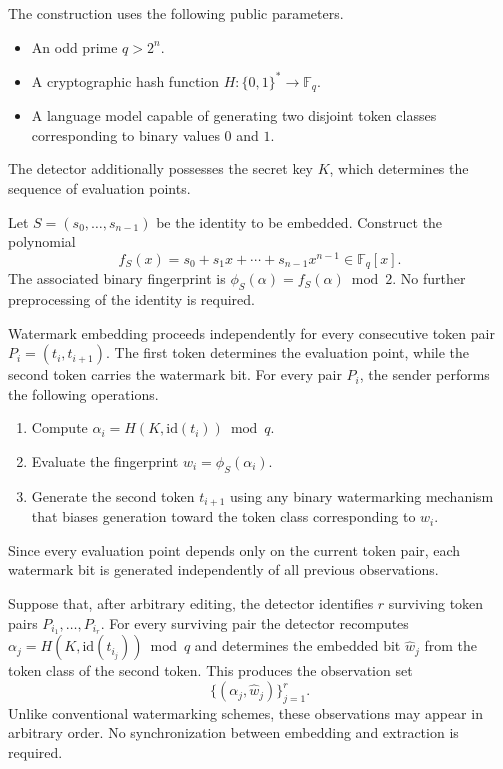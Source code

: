 \documentclass[a4paper,11pt]{llncs}
\begin{document}
The construction uses the following public parameters.
\begin{itemize}
\item
An odd prime
$q>2^n.$
\item
A cryptographic hash function
$H:\{0,1\}^*\rightarrow\mathbb F_q.$
\item
A language model capable of generating two disjoint token classes
corresponding to binary values $0$ and $1$.
\end{itemize}
%
The detector additionally possesses the secret key $K$,
which determines the sequence of evaluation points.

Let $S=(s_0,\ldots,s_{n-1})$ be the identity to be embedded.
Construct the polynomial
\[
f_S(x)
=
s_0+s_1x+\cdots+s_{n-1}x^{n-1}
\in\mathbb F_q[x].
\]
The associated binary fingerprint is
$\phi_S(\alpha)
=
f_S(\alpha)\bmod2.$
No further preprocessing of the identity is required.

Watermark embedding proceeds independently for every consecutive token
pair $P_i=(t_i,t_{i+1}).$ The first token determines the evaluation point, while the second token
carries the watermark bit.
For every pair $P_i$, the sender performs the following operations.
%
\begin{enumerate}
\item
Compute
$\alpha_i
=
H(K,\mathrm{id}(t_i))
\bmod q.$
\item
Evaluate the fingerprint
$w_i
=
\phi_S(\alpha_i).$
\item
Generate the second token $t_{i+1}$
using any binary watermarking mechanism that biases generation toward
the token class corresponding to $w_i$.
\end{enumerate}
%
Since every evaluation point depends only on the current token pair,
each watermark bit is generated independently of all previous
observations.


Suppose that, after arbitrary editing, the detector identifies
$r$ surviving token pairs
$P_{i_1},
\ldots,
P_{i_r}.$
For every surviving pair the detector recomputes
$\alpha_j
=
H(K,\mathrm{id}(t_{i_j}))
\bmod q $
and determines the embedded bit
$\hat w_j$
from the token class of the second token.
This produces the observation set
\[
\{
(\alpha_j,\hat w_j)
\}_{j=1}^{r}.
\]
Unlike conventional watermarking schemes, these observations may appear
in arbitrary order.
No synchronization between embedding and extraction is required.
\end{document}
